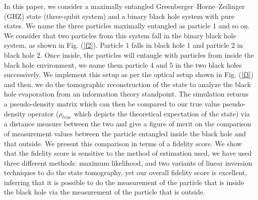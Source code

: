 \documentclass[fleqn,usenatbib]{mnras}
\begin{document}
In this paper, we consider a maximally entangled Greenberger–Horne–Zeilinger (GHZ) state (three-qubit system) and a binary black hole system with pure states. We name the three particles maximally entangled as particle $1$ and so on. We consider that two particles from this system fall in the binary black hole system, as shown in Fig. (\ref{f2}). Particle $1$ falls in black hole $1$ and particle $2$ in black hole $2$. Once inside, the particles will entangle with particles from inside the black hole environment, we name them particle $4$ and $5$ in the two black holes successively.  We implement this setup as per the optical setup shown in Fig. (\ref{f3}) and then, we do the tomographic reconstruction of the state to analyze the black hole evaporation from an information theory standpoint. The simulation returns a pseudo-density matrix which can then be compared to our true value pseudo-density operator ($\rho_{true}$ which depicts the theoretical expectation of the state) via a distance measure between the two and give a figure of merit on the comparison of measurement values between the particle entangled inside the black hole and that outside. We present this comparison in terms of a fidelity score. We show that the fidelity score is sensitive to the method of estimation used, we have used three different methods: maximum likelihood, and two variants of linear inversion techniques to do the state tomography, yet our overall fidelity score is excellent, inferring that it is possible to do the measurement of the particle that is inside the black hole via the measurement of the particle that is outside. 
\end{document}
